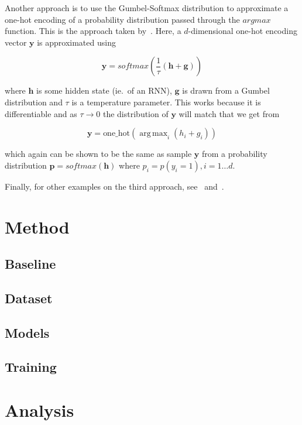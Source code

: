 \documentclass{article}
\DeclareMathOperator*{\argmax}{arg\,max}
\begin{document}
Another approach is to use the Gumbel-Softmax distribution to approximate a
one-hot encoding of a probability distribution passed through the $argmax$
function. This is the approach taken by~\cite{kusner2016gans}. Here, a
$d$-dimensional one-hot encoding vector $\bm{y}$ is approximated using

\begin{equation}
    \bm{y} = softmax(\frac{1}{\tau}(\bm{h}+\bm{g}))
\end{equation}

where $\bm{h}$ is some hidden state (ie.\ of an RNN), $\bm{g}$ is drawn from a
Gumbel distribution and $\tau$ is a temperature parameter. This works because it
is differentiable and as $\tau \to 0$ the distribution of $\bm{y}$ will match
that we get from

\begin{equation}
    \bm{y} = \text{one\_hot}(\argmax_{i}(h_i + g_i))
\end{equation}

which again can be shown to be the same as sample $\bm{y}$ from a probability
distribution $\bm{p} = softmax(\bm{h})$ where $p_i = p(y_i=1), i = 1\dots d$.

Finally, for other examples on the third approach,
see~\cite{donahue2018adversarial} and~\cite{haidar2019textkdgan}.

\section{Method}\label{sec:method}


\subsection{Baseline}


\subsection{Dataset}\label{sec:dataset}


\subsection{Models}\label{sec:models}


\subsection{Training}\label{sec:training}


\section{Analysis}\label{sec:analysis}
\end{document}
